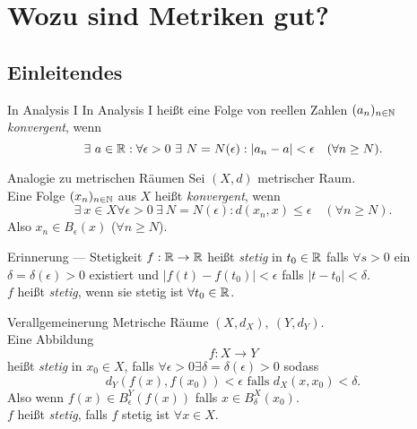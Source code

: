 \chapter{Wozu sind Metriken gut?}

\section{Einleitendes}

\begin{bla}{In Analysis I}
  In Analysis I heißt eine Folge von reellen Zahlen $ (a_n)_{n \in \mathbb{N}} $ \emph{konvergent}, wenn
  \begin{equation*}
    \exists \ a \in \mathbb{R} : \forall \epsilon > 0 \ \exists \ N = N(\epsilon) : \vert a_n - a \vert < \epsilon \quad (\forall n \geq N)\text{.}
  \end{equation*}
\end{bla}

\begin{bla}{Analogie zu metrischen Räumen}
  Sei $ (X, d) $ metrischer Raum. \\
  Eine Folge $ (x_n)_{n \in \mathbb{N}} $ aus $ X $ heißt \emph{konvergent}, wenn
  \begin{equation*}
    \exists \ x \in X \forall \epsilon > 0 \ \exists \ N = N(\epsilon) : d(x_n, x) \leq \epsilon \quad (\forall n \geq N)\text{.}
  \end{equation*}
  Also $ x_n \in B_\epsilon(x) $ ($ \forall n \geq N $).
\end{bla}

\begin{bla}{Erinnerung --- Stetigkeit}
  $ f: \mathbb{R} \to \mathbb{R} $ heißt \emph{stetig} in $ t_0 \in \mathbb{R} $ falls $ \forall s > 0 $ ein $ \delta = \delta(\epsilon) > 0 $ existiert und $ \vert f(t)-f(t_0) \vert < \epsilon $ falls $ \vert t - t_0 \vert < \delta $. \\
  $ f $ heißt \emph{stetig}, wenn sie stetig ist $ \forall t_0 \in \mathbb{R} $.
\end{bla}

\begin{bla}{Verallgemeinerung}
  Metrische Räume $ (X, d_X), \ (Y, d_Y) $. \\
  Eine Abbildung
  \begin{equation*}
    f: X \to Y
  \end{equation*}
  heißt \emph{stetig} in $ x_0 \in X $, falls $ \forall \epsilon > 0 \exists \delta = \delta(\epsilon) > 0 $ sodass
  \begin{equation*}
    d_Y(f(x), f(x_0)) < \epsilon \text{ falls } d_X(x, x_0) < \delta\text{.}
  \end{equation*}
  Also wenn $ f(x) \in B_\epsilon^Y(f(x)) $ falls $ x \in B_\delta^X(x_0) $. \\
  $ f $ heißt \emph{stetig}, falls $ f $ stetig ist $ \forall x \in X $.
\end{bla}

